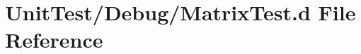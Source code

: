 \hypertarget{_matrix_test_8d}{\section{Unit\+Test/\+Debug/\+Matrix\+Test.d File Reference}
\label{_matrix_test_8d}
}
